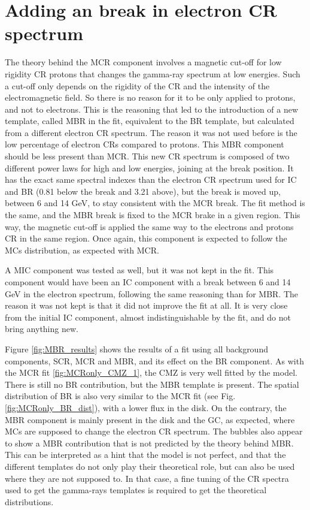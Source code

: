\newpage
\section{Adding an break in electron CR spectrum}

The theory behind the MCR component involves a magnetic cut-off for low rigidity CR protons that changes the gamma-ray spectrum at low energies. Such a cut-off only depends on the rigidity of the CR and the intensity of the electromagnetic field. So there is no reason for it to be only applied to protons, and not to electrons. This is the reasoning that led to the introduction of a new template, called MBR in the fit, equivalent to the BR template, but calculated from a different electron CR spectrum. The reason it was not used before is the low percentage of electron CRs compared to protons. This MBR component should be less present than MCR.
This new CR spectrum is composed of two different power laws for high and low energies, joining at the break position. It has the exact same spectral indexes than the electron CR spectrum used for IC and BR (0.81 below the break and 3.21 above), but the break is moved up, between 6 and 14 GeV, to stay consistent with the MCR break. The fit method is the same, and the MBR break is fixed to the MCR brake in a given region. This way, the magnetic cut-off is applied the same way to the electrons and protons CR in the same region. Once again, this component is expected to follow the MCs distribution, as expected with MCR.

A MIC component was tested as well, but it was not kept in the fit. This component would have been an IC component with a break between 6 and 14 GeV in the electron spectrum, following the same reasoning than for MBR.
The reason it was not kept is that it did not improve the fit at all. It is very close from the initial IC component, almost indistinguishable by the fit, and do not bring anything new.

Figure \ref{fig:MBR_results} shows the results of a fit using all background components, SCR, MCR and MBR, and its effect on the BR component. As with the MCR fit \ref{fig:MCRonly_CMZ_1}, the CMZ is very well fitted by the model. There is still no BR contribution, but the MBR template is present. The spatial distribution of BR is also very similar to the MCR fit (see Fig. \ref{fig:MCRonly_BR_dist}), with a lower flux in the disk. On the contrary, the MBR component is mainly present in the disk and the GC, as expected, where MCs are supposed to change the electron CR spectrum. The bubbles also appear to show a MBR contribution that is not predicted by the theory behind MBR. This can be interpreted as a hint that the model is not perfect, and that the different templates do not only play their theoretical role, but can also be used where they are not supposed to. In that case, a fine tuning of the CR spectra used to get the gamma-rays templates is required to get the theoretical distributions.


